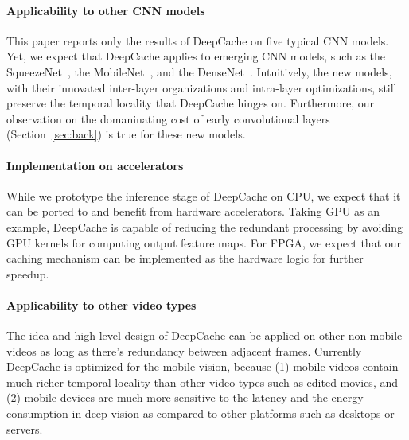 \documentclass[10pt,acmtog]{acmart}
\newcommand{\framework}{DeepCache\xspace}
\newcommand{\sys}{\framework{}}
\begin{document}
{%

\paragraph{Applicability to other CNN models}
This paper reports only the results of \framework on five typical CNN models.
Yet, we expect that \framework{} applies to emerging CNN models, such as the SqueezeNet~\cite{squeezenet}, the MobileNet~\cite{MobileNet}, and the DenseNet~\cite{huang2017densely}. 
Intuitively, the new models, with their innovated inter-layer organizations and intra-layer optimizations, still preserve the temporal locality that \framework hinges on.
Furthermore, our observation on the domaninating cost of early convolutional layers (Section~\ref{sec:back}) is true for these new models.

\paragraph{Implementation on accelerators}
While we prototype the inference stage of \framework{} on CPU, we expect that it can be ported to and benefit from hardware accelerators. 
Taking GPU as an example, \framework{} is capable of reducing the redundant processing by avoiding GPU kernels for computing output feature maps. 
For FPGA, we expect that our caching mechanism can be implemented as the hardware logic for further speedup. 

\paragraph{Applicability to other video types}
The idea and high-level design of \sys{} can be applied on other non-mobile videos as long as there's redundancy between adjacent frames. Currently \sys{} is optimized for the mobile vision, because (1) mobile videos contain much richer temporal locality than other video types such as edited movies, and (2) mobile devices are much more sensitive to the latency and the energy consumption in deep vision as compared to other platforms such as desktops or servers.

}%
\end{document}
